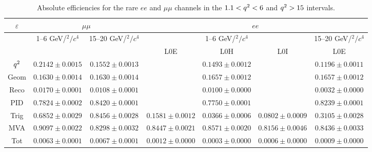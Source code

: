 \begin{landscape}

\begin{table}
\centering
\caption{Absolute efficiencies for the rare $ee$ and $\mu\mu$ channels in the $1.1 < {q^2} < 6$ and ${q^2} > 15$ \gevgevcccc intervals.}
\begin{tabular}{|c|c|c|c|c|c|c|}
\hline $\varepsilon$ 			&  \multicolumn {2}{c|}{$\mu\mu$} 				& \multicolumn {4}{c|}{$ee$} \\ \hline
&  1--6 GeV/$^2/c^4$ 				& 15--20 GeV/$^2/c^4$  				& \multicolumn {3}{c|}{1--6 GeV/$^2/c^4$} 				& \multicolumn {1}{c|}{15--20 GeV/$^2/c^4$ }\\ \hline
							&  \multicolumn {2}{c|}{} &  L0E 	& L0H 	& L0I 	& L0E 	\\ \hline
${q^2}$  & $ 0.2142  \pm  0.0015 $ & $ 0.1552  \pm  0.0013 $ &  \multicolumn{3}{c|}{$ 0.1493  \pm  0.0012 $} & \multicolumn{1}{c|}{$ 0.1196  \pm  0.0011 $} \\
Geom  & $ 0.1630  \pm  0.0014 $ & $ 0.1630  \pm  0.0014 $ &  \multicolumn{3}{c|}{$ 0.1657  \pm  0.0012 $} & \multicolumn{1}{c|}{$ 0.1657  \pm  0.0012 $} \\
Reco  & $ 0.0170  \pm  0.0001 $ & $ 0.0108  \pm  0.0001 $ &  \multicolumn{3}{c|}{$ 0.0100  \pm  0.0000 $} & \multicolumn{1}{c|}{$ 0.0032  \pm  0.0000 $} \\
PID  & $ 0.7824  \pm  0.0002 $ & $ 0.8420  \pm  0.0001 $ &  \multicolumn{3}{c|}{$ 0.7750  \pm  0.0001 $} & \multicolumn{1}{c|}{$ 0.8239  \pm  0.0001 $} \\
							\hline
Trig  & $ 0.6852  \pm  0.0029 $ & $ 0.8456  \pm  0.0028 $ & $ 0.1581  \pm  0.0012 $ & $ 0.0366  \pm  0.0006 $ & $ 0.0802  \pm  0.0009 $ & $ 0.3105  \pm  0.0028 $  \\
MVA  & $ 0.9097  \pm  0.0022 $ & $ 0.8298  \pm  0.0032 $ & $ 0.8447  \pm  0.0021 $ & $ 0.8571  \pm  0.0020 $ & $ 0.8156  \pm  0.0046 $ & $ 0.8436  \pm  0.0033 $  \\
						\hline
Tot  & $ 0.0063  \pm  0.0001 $ & $ 0.0067  \pm  0.0001 $ & $ 0.0012  \pm  0.0000 $ & $ 0.0003  \pm  0.0000 $ & $ 0.0006  \pm  0.0000 $ & $ 0.0009  \pm  0.0000 $  \\
							\hline

\end{tabular}
\label{tab:RKst_AbsEff}
\end{table}



\end{landscape}

